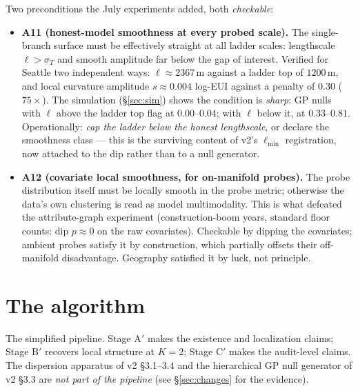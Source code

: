 \documentclass[11pt]{article}
\begin{document}
Two preconditions the July experiments added, both \emph{checkable}:

\begin{itemize}[leftmargin=1.8em,itemsep=2pt]
  \item \textbf{A11 (honest-model smoothness at every probed scale).} The single-branch
  surface must be effectively straight at all ladder scales: lengthscale $\ell>\sigma_T$ and
  smooth amplitude far below the gap of interest. Verified for Seattle two independent ways:
  $\ell\approx 2367$\,m against a ladder top of $1200$\,m, and local curvature amplitude
  $s\approx 0.004$ log-EUI against a penalty of $0.30$ ($75\times$). The simulation
  (\S\ref{sec:sim}) shows the condition is \emph{sharp}: GP nulls with $\ell$ above the
  ladder top flag at $0.00$--$0.04$; with $\ell$ below it, at $0.33$--$0.81$. Operationally:
  \emph{cap the ladder below the honest lengthscale}, or declare the smoothness class ---
  this is the surviving content of v2's $\ell_{\min}$ registration, now attached to the dip
  rather than to a null generator.
  \item \textbf{A12 (covariate local smoothness, for on-manifold probes).} The probe
  distribution itself must be locally smooth in the probe metric; otherwise the data's own
  clustering is read as model multimodality. This is what defeated the attribute-graph
  experiment (construction-boom years, standard floor counts: dip $p\approx 0$ on the raw
  covariates). Checkable by dipping the covariates; ambient probes satisfy it by
  construction, which partially offsets their off-manifold disadvantage. Geography satisfied
  it by luck, not principle.
\end{itemize}

\section{The algorithm}
\label{sec:algorithm}

The simplified pipeline. Stage A$'$ makes the existence and localization claims; Stage B$'$
recovers local structure at $K{=}2$; Stage C$'$ makes the audit-level claims. The dispersion
apparatus of v2 \S3.1--3.4 and the hierarchical GP null generator of v2 \S3.3 are \emph{not
part of the pipeline} (see \S\ref{sec:changes} for the evidence).
\end{document}
